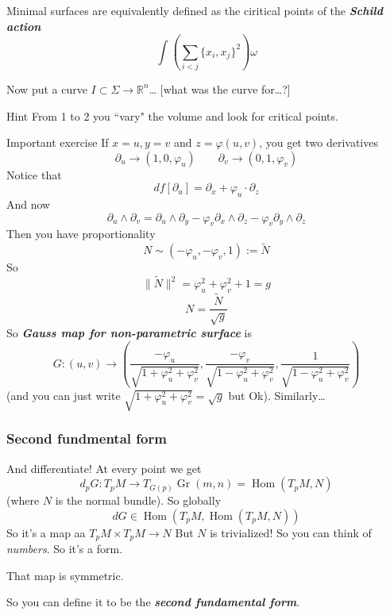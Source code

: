 \begin{claim}\leavevmode
Minimal surfaces are equivalently defined as the ciritical points of the \textit{\textbf{Schild action}} 
\[\int \left(\sum_{i<j}\{x_i,x_j\}^2\right)\omega\]

\end{claim}
Now put a curve \(I \subset \Sigma \to \mathbb{R}^n\)… [what was the curve for…?]

\begin{thing7}{Hint}\leavevmode
From 1 to 2 you ``vary" the volume and look for critical points.
\end{thing7}

\begin{thing6}{Important exercise}\leavevmode
If \(x=u,y=v\) and \(z=\varphi(u,v)\), you get two derivatives
\[\partial_u \to (1,0,\varphi_u)\qquad \partial_v \to (0,1,\varphi_v)\]
Notice that
\[df[\partial_u]=\partial_x+\varphi_u\cdot \partial_z\]
And now
\[\partial_u \wedge \partial_v = \partial_u \wedge \partial_y- \varphi_v\partial_x \wedge\partial_z-\varphi_v \partial_y \wedge \partial_z\]
Then you have proportionality
\[N \sim (-\varphi_u,-\varphi_v,1):=\tilde{N}\]
So
\[\|\tilde{N}\|^2=\varphi_u^2+\varphi_v^2+1=g\]
\[N=\frac{\tilde{N}}{\sqrt{g} }\]
So \textit{\textbf{Gauss map for non-parametric surface}} is 
\[G:(u,v) \longrightarrow\left(\frac{-\varphi_u}{\sqrt{1+\varphi^2_u+\varphi^2_v} },\frac{-\varphi_v}{\sqrt{1-\varphi^2_u+\varphi^2_v} },\frac{1}{\sqrt{1-\varphi_u^2+\varphi_v^2} }\right) \]
(and you can just write \(\sqrt{1+\varphi_u^2+\varphi_v^2} =\sqrt{g} \) but Ok). Similarly…
\end{thing6}

\subsubsection{Second fundmental form}

And differentiate! At every point we get
\[d_pG:T_pM \to T_{G(p)}\operatorname{Gr}(m,n)=\operatorname{Hom}(T_pM,N )\]
(where \(N\) is the normal bundle). So globally
\[dG \in \operatorname{Hom}(T_pM,\operatorname{Hom}(T_pM, N))\]
So it's a map aa
\(T_pM \times T_pM \to N\) 
But \(N\) is trivialized! So you can think of  \textit{numbers}. So it's a form.

\begin{claim}[Exercise]\leavevmode
That map is symmetric.
\end{claim}
So you can define it to be the \textit{\textbf{second fundamental form}}.


